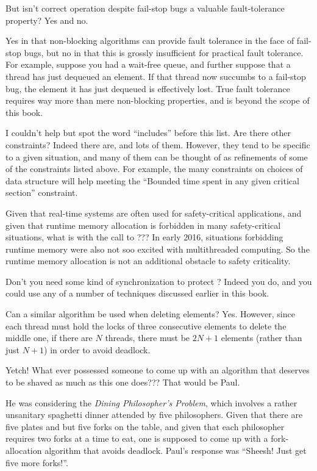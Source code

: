 \begin{enumerate}
\QuickQ{}
	But isn't correct operation despite fail-stop bugs
	a valuable fault-tolerance property?
\QuickA{}
	Yes and no.

	Yes in that non-blocking algorithms can provide fault tolerance
	in the face of fail-stop bugs, but no in that this is grossly
	insufficient for practical fault tolerance.
	For example, suppose you had a wait-free queue, and further
	suppose that a thread has just dequeued an element.
	If that thread now succumbs to a fail-stop bug, the element
	it has just dequeued is effectively lost.
	True fault tolerance requires way more than mere non-blocking
	properties, and is beyond the scope of this book.

\QuickQ{}
	I couldn't help but spot the word ``includes'' before this list.
	Are there other constraints?
\QuickA{}
	Indeed there are, and lots of them.
	However, they tend to be specific to a given situation,
	and many of them can be thought of as refinements of some of
	the constraints listed above.
	For example, the many constraints on choices of data structure
	will help meeting the ``Bounded time spent in any given critical
	section'' constraint.

\QuickQ{}
	Given that real-time systems are often used for safety-critical
	applications, and given that runtime memory allocation is
	forbidden in many safety-critical situations, what is with
	the call to ???
\QuickA{}
	In early 2016, situations forbidding runtime memory were
	also not soo excited with multithreaded computing.
	So the runtime memory allocation is not an additional
	obstacle to safety criticality.

\QuickQ{}
	Don't you need some kind of synchronization to protect
	?
\QuickA{}
	Indeed you do, and you could use any of a number of techniques
	discussed earlier in this book.

\QuickQ{}
	Can a similar algorithm be used when deleting elements?
\QuickA{}
	Yes.
	However, since each thread must hold the locks of three
	consecutive elements to delete the middle one, if there
	are $N$ threads, there must be $2N+1$ elements (rather than
	just $N+1$) in order to avoid deadlock.

\QuickQ{}
	Yetch!
	What ever possessed someone to come up with an algorithm
	that deserves to be shaved as much as this one does???
\QuickA{}
	That would be Paul.

	He was considering the \emph{Dining Philosopher's Problem}, which
	involves a rather unsanitary spaghetti dinner attended by
	five philosophers.
	Given that there are five plates and but five forks on the table, and
	given that each philosopher requires two forks at a time to eat,
	one is supposed to come up with a fork-allocation algorithm that
	avoids deadlock.
	Paul's response was ``Sheesh!  Just get five more forks!''.


\end{enumerate}

